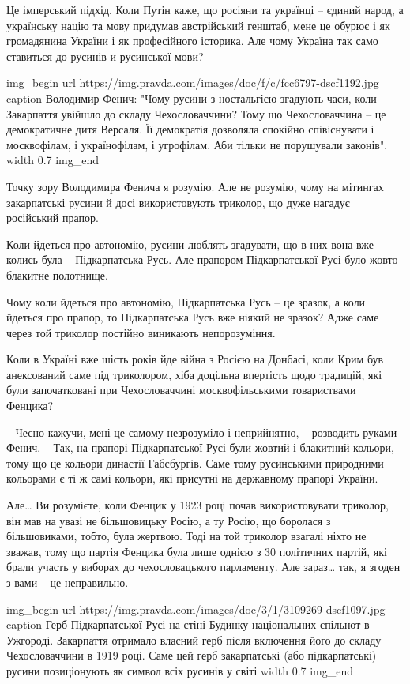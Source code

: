 Це імперський підхід. Коли Путін каже, що росіяни та українці – єдиний народ, а
українську націю та мову придумав австрійський генштаб, мене це обурює і як
громадянина України і як професійного історика. Але чому Україна так само
ставиться до русинів и русинської мови?

\ifcmt
img_begin 
        url https://img.pravda.com/images/doc/f/c/fcc6797-dscf1192.jpg
        caption Володимир Фенич: "Чому русини з ностальгією згадують часи, коли Закарпаття увійшло до складу Чехословаччини? Тому що Чехословаччина – це демократичне дитя Версаля. Її демократія дозволяла спокійно співіснувати і москвофілам, і українофілам, і угрофілам. Аби тільки не порушували законів".
        width 0.7
img_end
\fi

Точку зору Володимира Фенича я розумію. Але не розумію, чому на мітингах
закарпатські русини й досі використовують триколор, що дуже нагадує російський
прапор.

Коли йдеться про автономію, русини люблять згадувати, що в них вона вже колись
була – Підкарпатська Русь. Але прапором Підкарпатської Русі було жовто-блакитне
полотнище.

Чому коли йдеться про автономію, Підкарпатська Русь – це зразок, а коли йдеться
про прапор, то Підкарпатська Русь вже ніякий не зразок? Адже саме через той
триколор постійно виникають непорозуміння.  

Коли в Україні вже шість років йде війна з Росією на Донбасі, коли Крим був
анексований саме під триколором, хіба доцільна впертість щодо традицій, які
були започатковані при Чехословаччині москвофільськими товариствами Фенцика?

– Чесно кажучи, мені це самому незрозуміло і неприйнятно, – розводить руками
Фенич. – Так, на прапорі Підкарпатської Русі були жовтий і блакитний кольори,
тому що це кольори династії Габсбургів. Саме тому русинськими природними
кольорами є ті ж самі кольори, які присутні на державному прапорі України.

Але… Ви розумієте, коли Фенцик у 1923 році почав використовувати триколор, він
мав на увазі не більшовицьку Росію, а ту Росію, що боролася з більшовиками,
тобто, була жертвою. Тоді на той триколор взагалі ніхто не зважав, тому що
партія Фенцика була лише однією з 30 політичних партій, які брали участь у
виборах до чехословацького парламенту. Але зараз… так, я згоден з вами – це
неправильно.

\ifcmt
img_begin 
        url https://img.pravda.com/images/doc/3/1/3109269-dscf1097.jpg
        caption Герб Підкарпатської Русі на стіні Будинку національних спільнот в Ужгороді. Закарпаття отримало власний герб після включення його до складу Чехословаччини в 1919 році. Саме цей герб закарпатські (або підкарпатські) русини позиціонують як символ всіх русинів у світі
        width 0.7
img_end
\fi

